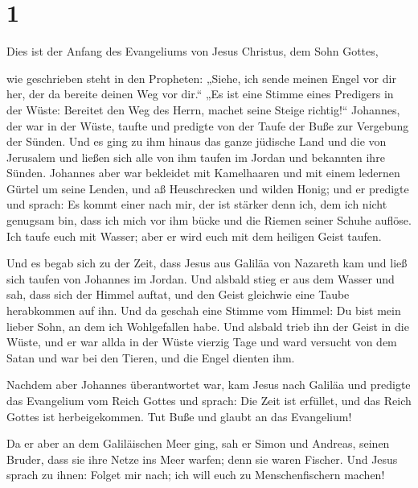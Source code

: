 \hypertarget{section}{%
\section{1}\label{section}}

 Dies ist der Anfang des Evangeliums von Jesus Christus,
dem Sohn Gottes,

 wie geschrieben steht in den Propheten: „Siehe, ich sende
meinen Engel vor dir her, der da bereite deinen Weg vor dir.``
 „Es ist eine Stimme eines Predigers in der Wüste:
Bereitet den Weg des Herrn, machet seine Steige richtig!{}``
 Johannes, der war in der Wüste, taufte und predigte von
der Taufe der Buße zur Vergebung der Sünden.  Und es ging
zu ihm hinaus das ganze jüdische Land und die von Jerusalem und ließen
sich alle von ihm taufen im Jordan und bekannten ihre Sünden.
 Johannes aber war bekleidet mit Kamelhaaren und mit einem
ledernen Gürtel um seine Lenden, und aß Heuschrecken und wilden Honig;
 und er predigte und sprach: Es kommt einer nach mir, der
ist stärker denn ich, dem ich nicht genugsam bin, dass ich mich vor ihm
bücke und die Riemen seiner Schuhe auflöse.  Ich taufe
euch mit Wasser; aber er wird euch mit dem heiligen Geist taufen.

 Und es begab sich zu der Zeit, dass Jesus aus Galiläa von
Nazareth kam und ließ sich taufen von Johannes im Jordan.
 Und alsbald stieg er aus dem Wasser und sah, dass sich
der Himmel auftat, und den Geist gleichwie eine Taube herabkommen auf
ihn.  Und da geschah eine Stimme vom Himmel: Du bist mein
lieber Sohn, an dem ich Wohlgefallen habe.  Und alsbald
trieb ihn der Geist in die Wüste,  und er war allda in
der Wüste vierzig Tage und ward versucht von dem Satan und war bei den
Tieren, und die Engel dienten ihm.

 Nachdem aber Johannes überantwortet war, kam Jesus nach
Galiläa und predigte das Evangelium vom Reich Gottes  und
sprach: Die Zeit ist erfüllet, und das Reich Gottes ist herbeigekommen.
Tut Buße und glaubt an das Evangelium!

 Da er aber an dem Galiläischen Meer ging, sah er Simon
und Andreas, seinen Bruder, dass sie ihre Netze ins Meer warfen; denn
sie waren Fischer.  Und Jesus sprach zu ihnen: Folget mir
nach; ich will euch zu Menschenfischern machen!

